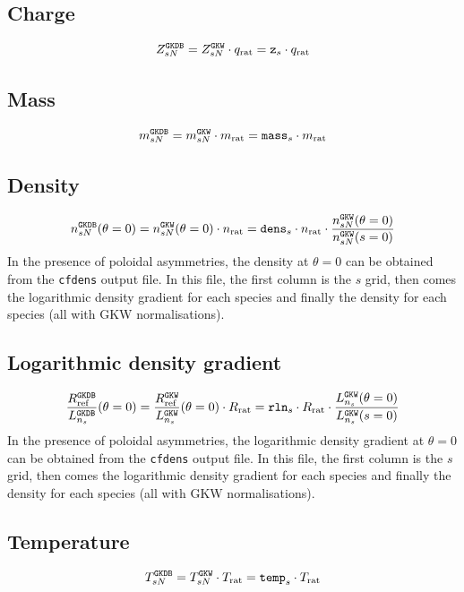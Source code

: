 \documentclass[a4paper]{report}
\begin{document}
\subsection{Charge}
\begin{equation}
Z_{sN}^{\texttt{GKDB}} = Z_{sN}^{\texttt{GKW}} \cdot q_\textrm{rat} = \texttt{z}_s \cdot q_\textrm{rat} 
\end{equation}

\subsection{Mass}
\begin{equation}
m_{sN}^{\texttt{GKDB}} = m_{sN}^{\texttt{GKW}} \cdot m_\textrm{rat} = \texttt{mass}_s \cdot m_\textrm{rat}
\end{equation}

\subsection{Density}
\begin{equation}
n_{sN}^{\texttt{GKDB}}(\theta=0) = n_{sN}^{\texttt{GKW}}(\theta=0) \cdot n_\textrm{rat} = \texttt{dens}_s \cdot n_\textrm{rat} \cdot \frac{n_{sN}^{\texttt{GKW}}(\theta=0)}{n_{sN}^{\texttt{GKW}}(s=0)}
\end{equation}
In the presence of poloidal asymmetries, the density at $\theta=0$ can be obtained from the \texttt{cfdens} output file. In this file, the first column is the $s$ grid, then comes the logarithmic density gradient for each species and finally the density for each species (all with GKW normalisations). 

\subsection{Logarithmic density gradient}
\begin{equation}
\frac{R_{\textrm{ref}}^{\texttt{GKDB}}}{L_{n_s}^{\texttt{GKDB}}}(\theta=0) =  \frac{R_{\textrm{ref}}^{\texttt{GKW}}}{L_{n_s}^{\texttt{GKW}}}(\theta=0) \cdot  R_\textrm{rat} = \texttt{rln}_s \cdot  R_\textrm{rat} \cdot \frac{{L_{n_s}^{\texttt{GKW}}}(\theta=0)}{{L_{n_s}^{\texttt{GKW}}}(s=0)}
\end{equation}
In the presence of poloidal asymmetries, the logarithmic density gradient at $\theta=0$ can be obtained from the \texttt{cfdens} output file. In this file, the first column is the $s$ grid, then comes the logarithmic density gradient for each species and finally the density for each species (all with GKW normalisations). 

\subsection{Temperature}
\begin{equation}
T_{sN}^{\texttt{GKDB}} = T_{sN}^{\texttt{GKW}} \cdot T_\textrm{rat} = \texttt{temp}_s \cdot T_\textrm{rat}
\end{equation}
\end{document}
